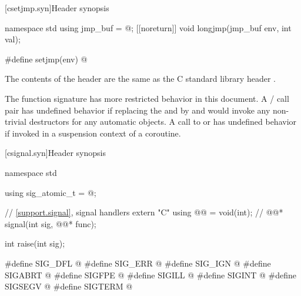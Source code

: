 
[csetjmp.syn]{Header  synopsis}

%
%
%
%
\begin{codeblock}
namespace std {
  using jmp_buf = @\seebelow@;
  [[noreturn]] void longjmp(jmp_buf env, int val);
}

#define setjmp(env) @\seebelow@
\end{codeblock}

\pnum
{}%
The contents of the header  are the same as the C
standard library header .

\pnum
The function signature
%
has more restricted behavior in this document.
A / call pair has undefined
behavior if replacing the  and 
by  and  would invoke any non-trivial destructors for any automatic
objects.
A call to  or  has undefined
behavior if invoked in a suspension context of a coroutine.


[csignal.syn]{Header  synopsis}

%
%
%
%
%
%
%
%
%
%
%
%
%
\begin{codeblock}
namespace std {
  using sig_atomic_t = @\seebelow@;

  // \ref{support.signal}, signal handlers
  extern "C" using @@ = void(int);  // \expos
  @@* signal(int sig, @@* func);

  int raise(int sig);
}

#define SIG_DFL @\seebelow@
#define SIG_ERR @\seebelow@
#define SIG_IGN @\seebelow@
#define SIGABRT @\seebelow@
#define SIGFPE @\seebelow@
#define SIGILL @\seebelow@
#define SIGINT @\seebelow@
#define SIGSEGV @\seebelow@
#define SIGTERM @\seebelow@
\end{codeblock}

